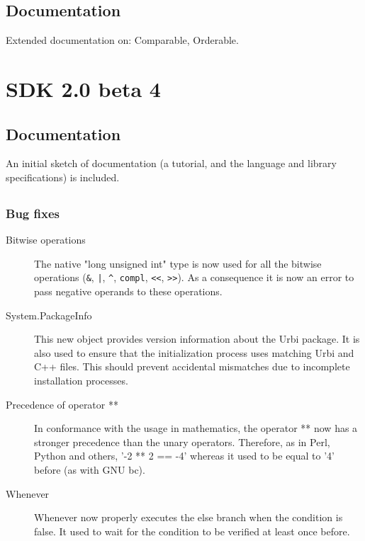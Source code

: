 \subsection{Documentation}

Extended documentation on: Comparable, Orderable.


\section{\urbi SDK 2.0 beta 4}

\subsection{Documentation}

An initial sketch of documentation (a tutorial, and the language and
library specifications) is included.

\subsection{\us}
\subsubsection{Bug fixes}

\begin{description}
\item[Bitwise operations] The native "long unsigned int" type is now
  used for all the bitwise operations (\lstinline|&|, \lstinline{|},
  \lstinline|^|, \lstinline|compl|, \lstinline|<<|, \lstinline|>>|).
  As a consequence it is now an error to pass negative operands to
  these operations.

\item[System.PackageInfo] This new object provides version information
  about the Urbi package.  It is also used to ensure that the
  initialization process uses matching Urbi and C++ files.  This
  should prevent accidental mismatches due to incomplete installation
  processes.

\item[Precedence of operator **] In conformance with the usage in
  mathematics, the operator ** now has a stronger precedence than the
  unary operators.  Therefore, as in Perl, Python and others, '-2 ** 2
  == -4' whereas it used to be equal to '4' before (as with GNU bc).

\item[Whenever] Whenever now properly executes the else branch when
  the condition is false.  It used to wait for the condition to be
  verified at least once before.
\end{description}

